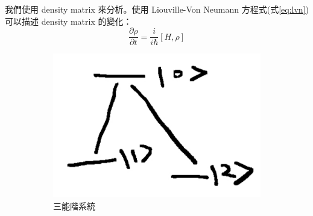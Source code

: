\documentclass[11pt,a4paper]{article}
\begin{document}
我們使用 density matrix 來分析。使用 Liouville-Von Neumann 方程式(式\ref{eq:lvn})可以描述 density matrix 的變化：\\

\begin{equation}
\label{eq:lvn}
\frac{\partial \rho}{\partial t} = \frac{i}{i\hbar} \left[ H,\rho \right]
\end{equation}

\begin{figure}[H]
\centering
\begin{subfigure}[b]{0.3\textwidth}
\centering
\includegraphics[width=\textwidth]{small_system/three.pdf}
\caption{三能階系統}
\label{fig:three_level}
\end{subfigure}
\begin{subfigure}[b]{0.3\textwidth}
\centering

\end{subfigure}
\end{figure}
\end{document}
